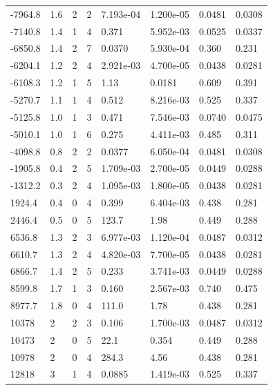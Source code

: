 \documentclass[preview]{standalone}
\begin{document}
{{\begin{tabular}{L{1.2cm}C{1.2cm} C{0.3cm}C{0.5cm} C{1.4cm}C{1.4cm} C{1.4cm}C{1.4cm}}
  -7964.8  &   1.6  & 2     &  2 &  7.193e-04  & 1.200e-05  & 0.0481 &  0.0308   \\ 
  -7140.8  &   1.4  & 1     &  4 &  0.371  & 5.952e-03  & 0.0525 &  0.0337   \\ 
  -6850.8  &   1.4  & 2     &  7 &  0.0370  & 5.930e-04  & 0.360 &  0.231   \\ 
  -6204.1  &   1.2  & 2     &  4 &  2.921e-03  & 4.700e-05  & 0.0438 &  0.0281   \\ 
  -6108.3  &   1.2  & 1     &  5 &  1.13  & 0.0181  & 0.609 &  0.391   \\ 
  -5270.7  &   1.1  & 1     &  4 &  0.512  & 8.216e-03  & 0.525 &  0.337   \\ 
  -5125.8  &   1.0  & 1     &  3 &  0.471  & 7.546e-03  & 0.0740 &  0.0475   \\ 
  -5010.1  &   1.0  & 1     &  6 &  0.275  & 4.411e-03  & 0.485 &  0.311   \\ 
  -4098.8  &   0.8  & 2     &  2 &  0.0377  & 6.050e-04  & 0.0481 &  0.0308   \\ 
  -1905.8  &   0.4  & 2     &  5 &  1.709e-03  & 2.700e-05  & 0.0449 &  0.0288   \\ 
  -1312.2  &   0.3  & 2     &  4 &  1.095e-03  & 1.800e-05  & 0.0438 &  0.0281   \\ 
  1924.4  &   0.4  & 0     &  4 &  0.399  & 6.404e-03  & 0.438 &  0.281   \\ 
  2446.4  &   0.5  & 0     &  5 &  123.7  & 1.98  & 0.449 &  0.288   \\ 
  6536.8  &   1.3  & 2     &  3 &  6.977e-03  & 1.120e-04  & 0.0487 &  0.0312   \\ 
  6610.7  &   1.3  & 2     &  4 &  4.820e-03  & 7.700e-05  & 0.0438 &  0.0281   \\ 
  6866.7  &   1.4  & 2     &  5 &  0.233  & 3.741e-03  & 0.0449 &  0.0288   \\ 
  8599.8  &   1.7  & 1     &  3 &  0.160  & 2.567e-03  & 0.740 &  0.475   \\ 
  8977.7  &   1.8  & 0     &  4 &  111.0  & 1.78  & 0.438 &  0.281   \\ 
  10378  &     2  & 2     &  3 &  0.106  & 1.700e-03  & 0.0487 &  0.0312   \\ 
  10473  &     2  & 0     &  5 &  22.1  & 0.354  & 0.449 &  0.288   \\ 
  10978  &     2  & 0     &  4 &  284.3  & 4.56  & 0.438 &  0.281   \\ 
  12818  &     3  & 1     &  4 &  0.0885  & 1.419e-03  & 0.525 &  0.337   \\ 

\end{tabular}}}
\end{document}
